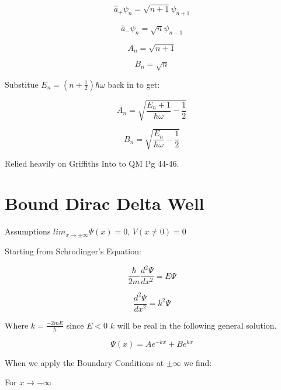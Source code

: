 \documentclass[12pt]{article}
\begin{document}
\begin{equation}
  \hat{a}_+\psi_n = \sqrt{n+1}\psi_{n+1}
\end{equation}

\begin{equation}
  \hat{a}_-\psi_n = \sqrt{n}\psi_{n-1}
\end{equation}

\begin{equation}
  A_n = \sqrt{n+1}
\end{equation}

\begin{equation}
  B_n = \sqrt{n} 
\end{equation}

Substitue $E_n=(n+\frac{1}{2})\hbar\omega$ back in to get:

\begin{equation}
  \boxed{A_n = \sqrt{\frac{E_n+1}{\hbar\omega}-\frac{1}{2}} }
\end{equation}

\begin{equation}
  \boxed{ B_n = \sqrt{\frac{E_n}{\hbar\omega}-\frac{1}{2}} }
\end{equation}

Relied heavily on Griffiths Into to QM Pg 44-46.

\section{Bound Dirac Delta Well}

Assumptions $lim_{x\to\pm\infty}\Psi(x)=0$, $V(x\neq{0})=0$
 
Starting from Schrodinger's Equation:

\begin{equation}
  \frac{\hbar}{2m}\frac{d^2\Psi}{dx^2}=E\Psi
\end{equation}

\begin{equation}
  \frac{d^2\Psi}{dx^2}=k^2\Psi
\end{equation}

Where $k=\frac{-2mE}{\hbar}$ since $E<0$ $k$ will be real in the following general solution.

\begin{equation}
  \Psi(x)=Ae^{-kx}+Be^{kx}
\end{equation}

When we apply the Boundary Conditions at $\pm\infty$ we find:

For $x\to-\infty$
\end{document}
